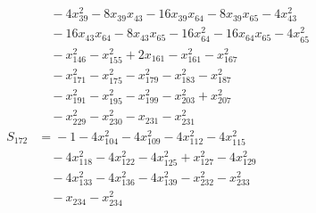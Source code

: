 \begin{align*}
&\quad{} -4x_{39}^{2} -8x_{39}x_{43} -16x_{39}x_{64} -8x_{39}x_{65} -4x_{43}^{2} \\
&\quad{} -16x_{43}x_{64} -8x_{43}x_{65} -16x_{64}^{2} -16x_{64}x_{65} -4x_{65}^{2} \\
&\quad{} -x_{146}^{2} -x_{155}^{2} +2x_{161} -x_{161}^{2} -x_{167}^{2} \\
&\quad{} -x_{171}^{2} -x_{175}^{2} -x_{179}^{2} -x_{183}^{2} -x_{187}^{2} \\
&\quad{} -x_{191}^{2} -x_{195}^{2} -x_{199}^{2} -x_{203}^{2} +x_{207}^{2} \\
&\quad{} -x_{229}^{2} -x_{230}^{2} -x_{231} -x_{231}^{2} \\
S_{172} &={} -1 -4x_{104}^{2} -4x_{109}^{2} -4x_{112}^{2} -4x_{115}^{2} \\
&\quad{} -4x_{118}^{2} -4x_{122}^{2} -4x_{125}^{2} +x_{127}^{2} -4x_{129}^{2} \\
&\quad{} -4x_{133}^{2} -4x_{136}^{2} -4x_{139}^{2} -x_{232}^{2} -x_{233}^{2} \\
&\quad{} -x_{234} -x_{234}^{2} \\
\end{align*}
\endgroup
